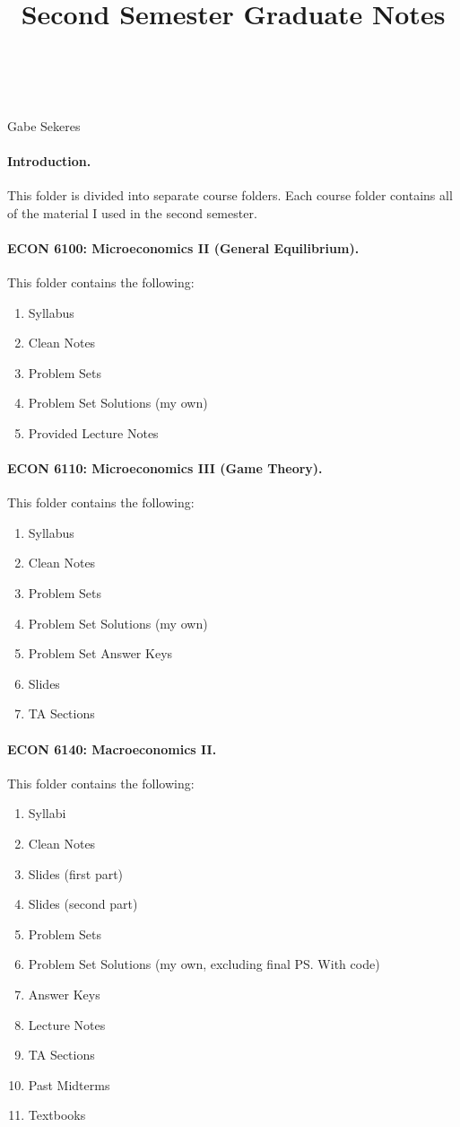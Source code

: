 \documentclass[12pt]{article}
\title{Second Semester Graduate Notes}
\makeatletter
\renewcommand{\maketitle}{
    \begin{tcolorbox}[colback=purple!5!white,colframe=black]
        \begin{center}
            \textbf{\@course} \\[0.25em]
            {\Large\textit{\@entitle}} \\[0.5em]
            Gabe Sekeres \\[0.5em]
            \@term
        \end{center}
    \end{tcolorbox}
    \vspace{1em}
}
\makeatother
\begin{document}
	\maketitle
	
	\paragraph{Introduction.} This folder is divided into separate course folders. Each course folder contains all of the material I used in the second semester.
	
	\paragraph{ECON 6100: Microeconomics II (General Equilibrium).} This folder contains the following:
	\begin{enumerate}
		\item Syllabus
		\item Clean Notes
		\item Problem Sets
		\item Problem Set Solutions (my own)
		\item Provided Lecture Notes
	\end{enumerate}
	
	\paragraph{ECON 6110: Microeconomics III (Game Theory).} This folder contains the following:
	\begin{enumerate}
		\item Syllabus
		\item Clean Notes
		\item Problem Sets
		\item Problem Set Solutions (my own)
		\item Problem Set Answer Keys
		\item Slides
		\item TA Sections
	\end{enumerate}
	
	
	\paragraph{ECON 6140: Macroeconomics II.} This folder contains the following:
	\begin{enumerate}
		\item Syllabi
		\item Clean Notes
		\item Slides (first part)
		\item Slides (second part)
		\item Problem Sets
		\item Problem Set Solutions (my own, excluding final PS. With code)
		\item Answer Keys
		\item Lecture Notes
		\item TA Sections
		\item Past Midterms
		\item Textbooks
	\end{enumerate}
	
\end{document}
